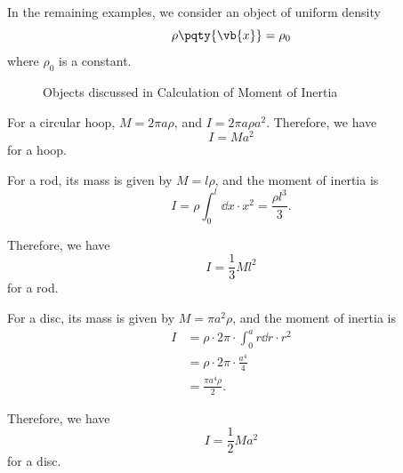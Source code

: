 In the remaining examples, we consider an object of uniform density
\begin{equation}
    \rho\pqty{\vb{x}} = \rho_0
\end{equation}
where \(\rho_0\) is a constant.

\begin{figure}[ht!]
    \centering

    \caption{Objects discussed in Calculation of Moment of Inertia}
    \label{fig:moment-of-inertia-calculation}
\end{figure}

\begin{example}
    \label{ex:moi-hoop}%
    For a circular hoop, \(M = 2 \pi a \rho\), and \(I = 2 \pi a \rho a^2\). Therefore, we have
    \begin{equation}
        \boxed{I = M a^2}
    \end{equation}
    for a hoop.
\end{example}

\begin{example}
    \label{ex:moi-rod}%
    For a rod, its mass is given by \(M = l \rho\), and the moment of inertia is
    \begin{equation}
        I = \rho \int_{0}^{l} \dd{x} \cdot x^2 = \frac{\rho l^3}{3}.
    \end{equation}

    Therefore, we have
    \begin{equation}
        I = \frac{1}{3} M l^2
    \end{equation}
    for a rod.
\end{example}

\begin{example}
    \label{ex:moi-disc}%
    For a disc, its mass is given by \(M = \pi a^2 \rho\), and the moment of inertia is
    \begin{subequations}\begin{align}
        I &= \rho \cdot 2\pi \cdot \int_{0}^{a} r \dd{r} \cdot r^2 \\
        &= \rho \cdot 2\pi \cdot \frac{a^4}{4} \\
        &= \frac{\pi a^4 \rho}{2}.
    \end{align}\end{subequations}
        
    Therefore, we have
    \begin{equation}
        \boxed{I = \frac{1}{2} M a^2}
    \end{equation}
    for a disc.
\end{example}


